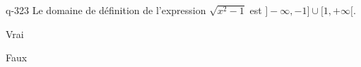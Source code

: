 \begin{truefalse}{q-323}
Le domaine de définition de l'expression $\sqrt{x^2-1}$ est $]-\infty,-1]\cup [1,+\infty[$.
\item* Vrai
\item Faux
\end{truefalse}

